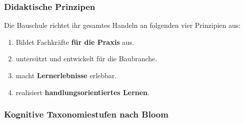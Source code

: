 \documentclass[
11pt,
captions=tableheading,
smallheadings,
headsepline,
footsepline, 
captions=tableheading,
parskip=half-,
]{scrartcl}
\begin{document}
\subsubsection{Didaktische Prinzipen}
Die Bauschule richtet ihr gesamtes Handeln an folgenden vier Prinzipien aus:
\begin{enumerate}
    \item Bildet Fachkräfte \textbf{für die Praxis} aus.
    \item untersützt und entwickelt   für die Baubranche.
    \item macht \textbf{Lernerlebnisse} erlebbar.
    \item realisiert \textbf{handlungsorientiertes Lernen}.
\end{enumerate}


\subsubsection{Kognitive Taxonomiestufen nach Bloom}
\end{document}
